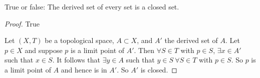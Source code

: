 
\setcounter{question}{6} %
\begin{question}[Macula]

True or false: The derived set of every set is a closed set. 

\end{question}

\begin{proof}

True

\bigbreak

Let $(X, T)$ be a topological space, $A \subset X$, and $A'$ the derived set of $A$. Let $p \in X$ and suppose $p$ is a limit point of $A'$. Then $\forall S \in T$ with $p \in S$, $\exists x \in A'$ such that $x \in S$. It follows that $\exists y \in A$ such that $y \in S \  \forall S \in T$ with $p \in S$. So $p$ is a limit point of $A$ and hence is in $A'$. So $A'$ is closed. 

\end{proof}


